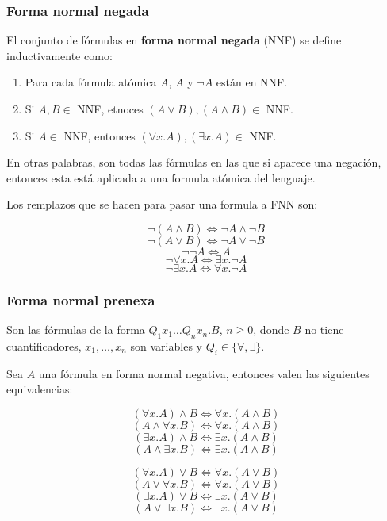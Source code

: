 \subsubsection*{Forma normal negada}
El conjunto de fórmulas en \textbf{forma normal negada} (NNF) se define inductivamente como:

\begin{enumerate}
\item Para cada fórmula atómica $A$, $A$ y $\lnot A$ están en NNF.
\item Si $A,B\in$ NNF, etnoces $(A\lor B),(A\land B) \in$ NNF.

\item Si $A\in$ NNF, entonces $(\forall x.A),(\exists x. A)\in$ NNF.
\end{enumerate}

En otras palabras, son todas las fórmulas en las que si aparece una negación, entonces esta está aplicada a una formula atómica del lenguaje.

Los remplazos que se hacen para pasar una formula a FNN son:

\begin{multicols}{2}
$$\lnot(A\land B) \iff \lnot A \land \lnot B$$
$$\lnot(A\lor B) \iff \lnot A \lor \lnot B$$
\vfill\null
\columnbreak
$$\lnot\lnot A \iff A$$
$$\lnot\forall x.A \iff \exists x.\lnot A$$
$$\lnot\exists x.A \iff \forall x.\lnot A$$
\end{multicols}

\subsubsection*{Forma normal prenexa}
Son las fórmulas de la forma $Q_1x_1\dots Q_nx_n.B$, $n\geq 0$, donde $B$ no tiene cuantificadores, $x_1,\dots,x_n$ son variables y $Q_i \in \{\forall,\exists\}$.

Sea $A$ una fórmula en forma normal negativa, entonces valen las siguientes equivalencias:

\begin{multicols}{2}
$$(\forall x.A)\land B \iff \forall x.(A\land B)$$
$$(A\land\forall x.B) \iff \forall x.(A\land B)$$
$$(\exists x.A)\land B \iff \exists x.(A\land B)$$
$$(A\land\exists x.B) \iff \exists x.(A\land B)$$

$$(\forall x.A)\lor B \iff \forall x.(A\lor B)$$
$$(A\lor\forall x.B) \iff \forall x.(A\lor B)$$
$$(\exists x.A)\lor B \iff \exists x.(A\lor B)$$
$$(A\lor\exists x.B) \iff \exists x.(A\lor B)$$
\end{multicols}

